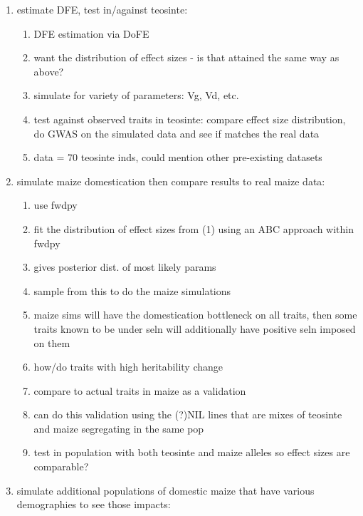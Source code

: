 \documentclass[10pt, letterpaper]{article}
\begin{document}
\begin{enumerate}

\item estimate DFE, test in\//against teosinte:

	\begin{enumerate}
	
	\item DFE estimation via DoFE
	\item want the distribution of effect sizes - is that attained the same way as above?
	\item simulate for variety of parameters: Vg, Vd, etc.
	\item test against observed traits in teosinte: compare effect size distribution, do GWAS on the simulated data and see if matches the real data
	\item data = 70 teosinte inds, could mention other pre-existing datasets

	\end{enumerate}

\item simulate maize domestication then compare results to real maize data:

	\begin{enumerate}
	
	\item use fwdpy
	\item fit the distribution of effect sizes from (1) using an ABC approach within fwdpy
	\item gives posterior dist. of most likely params
	\item sample from this to do the maize simulations
	\item maize sims will have the domestication bottleneck on all traits, then some traits known to be under seln will additionally have positive seln imposed on them
	\item how\//do traits with high heritability change
	\item compare to actual traits in maize as a validation
	\item can do this validation using the (?)NIL lines that are mixes of teosinte and maize segregating in the same pop
	\item test in population with both teosinte and maize alleles so effect sizes are comparable?

	\end{enumerate}

\item simulate additional populations of domestic maize that have various demographies to see those impacts:


\end{enumerate}
\end{document}
